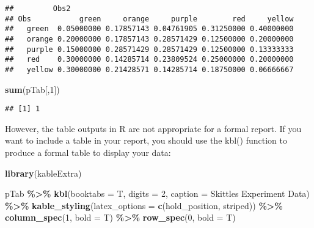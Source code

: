 \documentclass[
]{article}
\newenvironment{Shaded}{\begin{snugshade}}{\end{snugshade}}
\newcommand{\AttributeTok}[1]{\textcolor[rgb]{0.13,0.29,0.53}{#1}}
\newcommand{\DecValTok}[1]{\textcolor[rgb]{0.00,0.00,0.81}{#1}}
\newcommand{\FunctionTok}[1]{\textcolor[rgb]{0.13,0.29,0.53}{\textbf{#1}}}
\newcommand{\NormalTok}[1]{#1}
\newcommand{\SpecialCharTok}[1]{\textcolor[rgb]{0.81,0.36,0.00}{\textbf{#1}}}
\newcommand{\StringTok}[1]{\textcolor[rgb]{0.31,0.60,0.02}{#1}}
\begin{document}
\begin{verbatim}
##         Obs2
## Obs           green     orange     purple        red     yellow
##   green  0.05000000 0.17857143 0.04761905 0.31250000 0.40000000
##   orange 0.20000000 0.17857143 0.28571429 0.12500000 0.20000000
##   purple 0.15000000 0.28571429 0.28571429 0.12500000 0.13333333
##   red    0.30000000 0.14285714 0.23809524 0.25000000 0.20000000
##   yellow 0.30000000 0.21428571 0.14285714 0.18750000 0.06666667
\end{verbatim}

\begin{Shaded}
\begin{Highlighting}[]
\FunctionTok{sum}\NormalTok{(pTab[,}\DecValTok{1}\NormalTok{])}
\end{Highlighting}
\end{Shaded}

\begin{verbatim}
## [1] 1
\end{verbatim}

However, the table outputs in R are not appropriate for a formal report.
If you want to include a table in your report, you should use the kbl()
function to produce a formal table to display your data:

\begin{Shaded}
\begin{Highlighting}[]
\FunctionTok{library}\NormalTok{(kableExtra)}

\NormalTok{pTab }\SpecialCharTok{\%\textgreater{}\%}
  \FunctionTok{kbl}\NormalTok{(}\AttributeTok{booktabs =}\NormalTok{ T, }\AttributeTok{digits =} \DecValTok{2}\NormalTok{, }\AttributeTok{caption =} \StringTok{\textquotesingle{}Skittles Experiment Data\textquotesingle{}}\NormalTok{) }\SpecialCharTok{\%\textgreater{}\%}
  \FunctionTok{kable\_styling}\NormalTok{(}\AttributeTok{latex\_options =} \FunctionTok{c}\NormalTok{(}\StringTok{\textquotesingle{}hold\_position\textquotesingle{}}\NormalTok{, }\StringTok{\textquotesingle{}striped\textquotesingle{}}\NormalTok{)) }\SpecialCharTok{\%\textgreater{}\%}
  \FunctionTok{column\_spec}\NormalTok{(}\DecValTok{1}\NormalTok{, }\AttributeTok{bold =}\NormalTok{ T) }\SpecialCharTok{\%\textgreater{}\%}
  \FunctionTok{row\_spec}\NormalTok{(}\DecValTok{0}\NormalTok{, }\AttributeTok{bold =}\NormalTok{ T)}
\end{Highlighting}
\end{Shaded}
\end{document}
